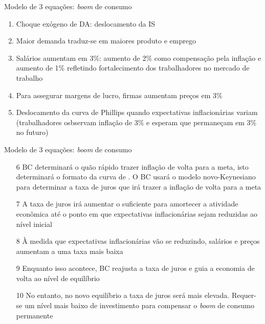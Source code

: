 \documentclass[10pt]{beamer}
\begin{document}
\begin{frame}
    {Modelo de 3 equações: \emph{boom} de consumo}
    \begin{enumerate}
        \item Choque exógeno de DA: deslocamento da IS\medskip
        \item Maior demanda traduz-se em maiores produto e emprego\medskip
        \item Salários aumentam em 3\%: aumento de 2\% como compensação pela inflação e aumento de 1\% refletindo fortalecimento dos trabalhadores no mercado de trabalho\medskip
        \item Para assegurar margens de lucro, firmas aumentam preços em 3\%\medskip
        \item Deslocamento da curva de Phillips quando expectativas inflacionárias variam (trabalhadores osbservam inflação de 3\% e esperam que permaneçam em 3\% no futuro)
    \end{enumerate}
\end{frame}

\begin{frame}
    {Modelo de 3 equações: \emph{boom} de consumo}
    \begin{enumerate}
        \item[6] BC determinará o quão rápido trazer inflação de volta para a meta, isto determinará o formato da curva de . O BC usará o modelo novo-Keynesiano para determinar a taxa de juros que irá trazer a inflação de volta para a meta\medskip
        \item[7] A taxa de juros irá aumentar o suficiente para amortecer a atividade econômica até o ponto em que expectativas inflacionárias sejam reduzidas ao nível inicial\medskip
        \item[8] À medida que expectativas inflacionárias vão se reduzindo, salários e preços aumentam a uma taxa mais baixa\medskip
        \item[9] Enquanto isso acontece, BC reajusta a taxa de juros e guia a economia de volta ao nível de equilíbrio\medskip
        \item[10] No entanto, no novo equilíbrio a taxa de juros será mais elevada. Requer-se um nível mais baixo de investimento para compensar o \emph{boom} de consumo permanente
    \end{enumerate}
\end{frame}
\end{document}
